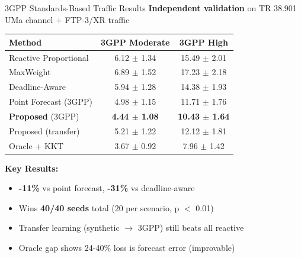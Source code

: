\documentclass[aspectratio=169]{beamer}
\begin{document}
\begin{frame}{3GPP Standards-Based Traffic Results}
\textbf{Independent validation} on TR 38.901 UMa channel + FTP-3/XR traffic

\begin{table}
\small
\begin{tabular}{lcc}
\toprule
\textbf{Method} & \textbf{3GPP Moderate} & \textbf{3GPP High} \\
\midrule
Reactive Proportional & 6.12 $\pm$ 1.34 & 15.49 $\pm$ 2.01 \\
MaxWeight & 6.89 $\pm$ 1.52 & 17.23 $\pm$ 2.18 \\
Deadline-Aware & 5.94 $\pm$ 1.28 & 14.38 $\pm$ 1.93 \\
Point Forecast (3GPP) & 4.98 $\pm$ 1.15 & 11.71 $\pm$ 1.76 \\
\textbf{Proposed} (3GPP) & \textbf{4.44 $\pm$ 1.08} & \textbf{10.43 $\pm$ 1.64} \\
Proposed (transfer) & 5.21 $\pm$ 1.22 & 12.12 $\pm$ 1.81 \\
Oracle + KKT & 3.67 $\pm$ 0.92 & 7.96 $\pm$ 1.42 \\
\bottomrule
\end{tabular}
\end{table}

\textbf{Key Results:}
\begin{itemize}
    \item \textbf{-11\%} vs point forecast, \textbf{-31\%} vs deadline-aware
    \item Wins \textbf{40/40 seeds} total (20 per scenario, p $<$ 0.01)
    \item Transfer learning (synthetic $\rightarrow$ 3GPP) still beats all reactive
    \item Oracle gap shows 24-40\% loss is forecast error (improvable)
\end{itemize}
\end{frame}
\end{document}
